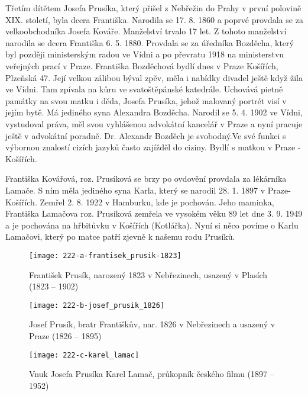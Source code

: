 \documentclass[../dejiny-rodu-prusiku.tex]{subfiles}
\begin{document}
Třetím dítětem Josefa Prusíka, který přišel z Nebřežin do Prahy v první polovině XIX. století, byla dcera Františka. Narodila se 17. 8. 1860 a poprvé provdala se za velkoobchodníka Josefa Kováře. Manželství trvalo 17 let. Z tohoto manželství narodila se dcera Františka 6. 5. 1880. Provdala se za úředníka Bozděcha, který byl později mi­nisterským radou ve Vídni a po převratu 1918 na ministerstvu veřejných prací v Praze. Františka Bozděchová bydlí dnes v Praze Košířích, Plzeňská 47. Její velkou zálibou býval zpěv, měla i nabídky divadel ještě když žila ve Vídni. Tam zpívala na kůru ve svatoštěpánské katedrále. Uchovává pietně památky na svou matku i děda, Josefa Prusíka, jehož malovaný portrét visí v jejím bytě. Má jediného syna Alexandra Bozděcha. Narodil se 5. 4. 1902 ve Vídni, vystudoval práva, měl svou vyhlášenou advokátní kancelář v Praze a nyní pracuje ještě v advo­kátní poradně. Dr. Alexandr Bozděch je svobodný.Ve své funkci s výbornou znalostí cizích jazyků často zajížděl do ciziny. Bydlí s matkou v Praze - Košířích.

Františka Kovářová, roz. Prusíková se brzy po ovdovění provdala za lékárníka Lamače. S ním měla jediného syna Karla, který se narodil 28. 1. 1897 v Praze-Košířích. Zemřel 2. 8. 1922 v Hamburku, kde je pochován. Jeho maminka, Františka Lamačova roz. Prusíková zemřela ve vysokém věku 89 let dne 3. 9. 1949 a je pochována na hřbitůvku v Košířích (Kotlářka). Nyní si něco povíme o Karlu Lamačovi, který po matce patří zjevně k našemu rodu Prusíků.

\begin{figure}
\centering
\texttt{[image: 222-a-frantisek\_prusik-1823]}
\caption{František Prusík, narozený 1823 v Nebřezinech, usazený v Plasích (1823 – 1902)}
\label{fig:222-a-frantisek_prusik-1823}
\end{figure}

             \begin{figure}
\centering
\texttt{[image: 222-b-josef\_prusik\_1826]}
\caption{Josef Prusík, bratr Františkův, nar. 1826 v Nebřezinech a usazený v Praze (1826 – 1895)}
\label{fig:222-b-josef_prusik_1826}
\end{figure}

\begin{figure}
\centering
\texttt{[image: 222-c-karel\_lamac]}
\caption{Vnuk Josefa Prusíka Karel Lamač, průkopník českého filmu (1897 – 1952)}
\label{fig:222-c-karel_lamac}
\end{figure}
\end{document}
